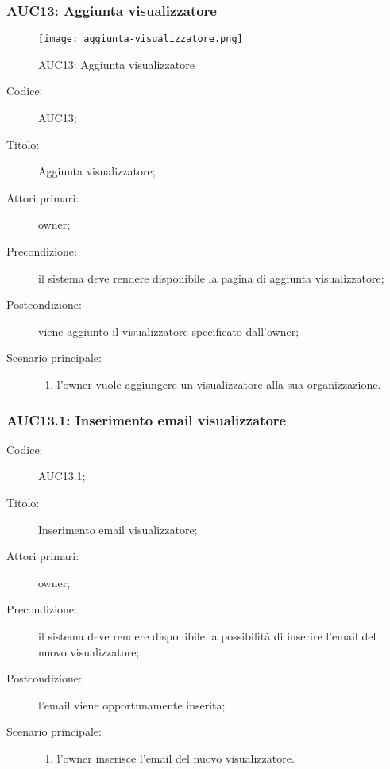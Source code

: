 \documentclass[../../../analisi-dei-requisiti.tex]{subfiles}
\begin{document}
\subsubsection{AUC13: Aggiunta visualizzatore}%
\label{subs:AUC13}

\begin{figure}[H]
  \centering
  \texttt{[image: aggiunta-visualizzatore.png]}
  \caption{AUC13: Aggiunta visualizzatore}%
  \label{fig:AUC13}
\end{figure}

\begin{description}
  \item[Codice:] AUC13;
  \item[Titolo:] Aggiunta visualizzatore;
  \item[Attori primari:] owner;
  \item[Precondizione:] il sistema deve rendere disponibile la pagina di aggiunta visualizzatore;
  \item[Postcondizione:] viene aggiunto il visualizzatore specificato dall'owner;
  \item[Scenario principale:]
  \begin{enumerate}
    \item l'owner vuole aggiungere un visualizzatore alla sua organizzazione.
  \end{enumerate}
\end{description}

\subsubsection{AUC13.1: Inserimento email visualizzatore}%
\label{subs:AUC13.1}
\begin{description}
  \item[Codice:] AUC13.1;
  \item[Titolo:] Inserimento email visualizzatore;
  \item[Attori primari:] owner;
  \item[Precondizione:] il sistema deve rendere disponibile la possibilità di inserire l'email del nuovo visualizzatore;
  \item[Postcondizione:] l'email viene opportunamente inserita;
  \item[Scenario principale:]
  \begin{enumerate}
    \item l'owner inserisce l'email del nuovo visualizzatore.
  \end{enumerate}
\end{description}
\end{document}

